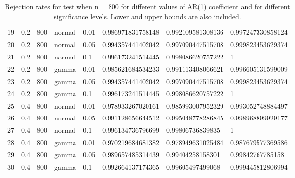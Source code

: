 \begin{table}[ht]
\begin{tabular}{rlllllll}
  19 & 0.2 & 800 & normal & 0.01 & 0.986971831758148 & 0.992109581308136 & 0.997247330858124 \\ 
  20 & 0.2 & 800 & normal & 0.05 & 0.994357441402042 & 0.997090447515708 & 0.999823453629374 \\ 
  21 & 0.2 & 800 & normal & 0.1 & 0.996173241514445 & 0.998086620757222 & 1 \\ 
  22 & 0.2 & 800 & gamma & 0.01 & 0.985621684534233 & 0.991113408066621 & 0.996605131599009 \\ 
  23 & 0.2 & 800 & gamma & 0.05 & 0.994357441402042 & 0.997090447515708 & 0.999823453629374 \\ 
  24 & 0.2 & 800 & gamma & 0.1 & 0.996173241514445 & 0.998086620757222 & 1 \\ 
  25 & 0.4 & 800 & normal & 0.01 & 0.978933267020161 & 0.985993007952329 & 0.993052748884497 \\ 
  26 & 0.4 & 800 & normal & 0.05 & 0.991128656644512 & 0.995048778286845 & 0.998968899929177 \\ 
  27 & 0.4 & 800 & normal & 0.1 & 0.996134736796699 & 0.99806736839835 & 1 \\ 
  28 & 0.4 & 800 & gamma & 0.01 & 0.970219684681382 & 0.978949631025484 & 0.987679577369586 \\ 
  29 & 0.4 & 800 & gamma & 0.05 & 0.989657485314439 & 0.99404258158301 & 0.99842767785158 \\ 
  30 & 0.4 & 800 & gamma & 0.1 & 0.992664137174365 & 0.99605497499068 & 0.999445812806994 \\ 
   \hline
\end{tabular}
\caption{Rejection rates for test when n = 800 for 
                   different values of AR(1) coefficient and for different 
                   significance levels. Lower and upper bounds are also 
                   included.} 
\label{rr_800}
\end{table}

